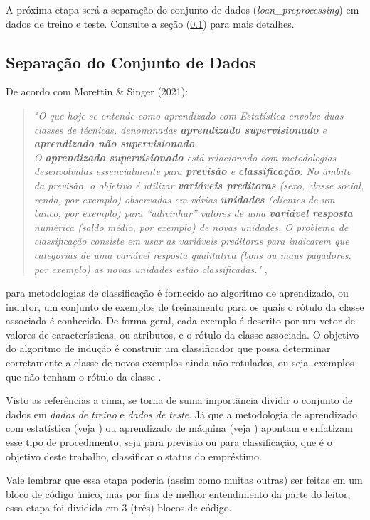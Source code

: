 \documentclass[a4paper,12pt]{article} %
\begin{document}
A próxima etapa será a separação do conjunto de dados (\textit{loan\_preprocessing}) em dados de treino e teste. Consulte a seção (\ref{section:3.3}) para mais detalhes.

\subsection{Separação do Conjunto de Dados} \label{section:3.3}
De acordo com Morettin \& Singer (2021):
\begin{quote}
    \textit{
    "O que hoje se entende como aprendizado com Estatística envolve duas classes de técnicas, denominadas \textbf{aprendizado supervisionado} e \textbf{aprendizado não supervisionado}. \\
    O \textbf{aprendizado supervisionado} está relacionado com metodologias desenvolvidas essencialmente para \textbf{previsão} e \textbf{classificação}. No âmbito da previsão, o objetivo é utilizar \textbf{variáveis preditoras} (sexo, classe social, renda, por exemplo) observadas em várias \textbf{unidades} (clientes de um banco, por exemplo) para “adivinhar” valores de uma \textbf{variável resposta} numérica (saldo médio, por exemplo) de novas unidades. O problema de classificação consiste em usar as variáveis preditoras para indicarem que categorias de uma variável resposta qualitativa (bons ou maus pagadores, por exemplo) as novas unidades estão classificadas."
    },
\end{quote}
para metodologias de classificação é fornecido ao algoritmo de aprendizado, ou indutor, um conjunto de exemplos de treinamento para os quais o rótulo da classe associada é conhecido. De forma geral, cada exemplo é descrito por um vetor de valores de características, ou atributos, e o rótulo da classe associada. O objetivo do algoritmo de indução é construir um classificador que possa determinar corretamente a classe de novos exemplos ainda não rotulados, ou seja, exemplos que não tenham o rótulo da classe \cite{monard2003conceitos}.

Visto as referências a cima, se torna de suma importância dividir o conjunto de dados em \textit{dados de treino} e \textit{dados de teste}. Já que a metodologia de aprendizado com estatística (veja \cite{morettin2021estatistica}) ou aprendizado de máquina (veja \cite{monard2003conceitos}) apontam e enfatizam esse tipo de procedimento, seja para previsão ou para classificação, que é o objetivo deste trabalho, classificar o status do empréstimo.

Vale lembrar que essa etapa poderia (assim como muitas outras) ser feitas em um bloco de código único, mas por fins de melhor entendimento da parte do leitor, essa etapa foi dividida em 3 (três) blocos de código.
\end{document}
